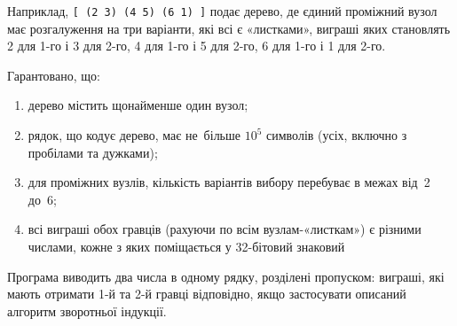 Наприклад, \texttt{[ (2 3) (4 5) (6 1) ]} подає дерево, де єдиний проміжний вузол має розгалуження на три варіанти, які всі є «листками», виграші яких становлять 
2 для 1-го і 3 для 2-го,
4 для 1-го і 5 для 2-го,
6 для 1-го і 1 для 2-го.


Гарантовано, що:
\begin{enumerate}
\item
дерево містить щонайменше один вузол;
\item
рядок, що кодує дерево, має не~більше $10^5$ символів (усіх, включно з пробілами та дужками);
\item
для проміжних вузлів, кількість варіантів вибору перебуває в межах від~2 до~6;
\item
всі виграші обох гравців (рахуючи по всім вузлам-«листкам») є різними числами, кожне з яких поміщається у 32-бітовий знаковий \end{enumerate}

\OutputFile
Програма виводить два числа в одному рядку, розділені пропуском: виграші, які мають отримати 1-й та 2-й гравці відповідно, якщо застосувати описаний алгоритм зворотньої індукції.

\Example

\begin{example}
\end{example}


\Note

